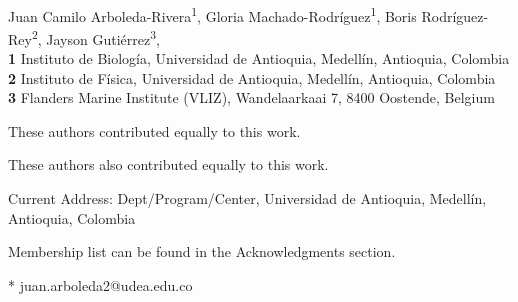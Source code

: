 \documentclass[10pt,letterpaper]{article}
\date{}
\begin{document}
\vspace*{0.2in}

\begin{flushleft}
{\Large
\textbf{} %
}
\newline
\\
Juan Camilo Arboleda-Rivera\textsuperscript{1\Yinyang},
Gloria Machado-Rodríguez\textsuperscript{1\Yinyang},
Boris Rodríguez-Rey\textsuperscript{2\textcurrency},
Jayson Gutiérrez\textsuperscript{3},
\\
\bigskip
\textbf{1} Instituto de Biología, Universidad de Antioquia, Medellín,
Antioquia, Colombia
\\
\textbf{2} Instituto de Física, Universidad de Antioquia, Medellín, Antioquia,
Colombia
\\
\textbf{3} Flanders Marine Institute (VLIZ), Wandelaarkaai 7, 8400 Oostende,
Belgium
\\
\bigskip

% 
%
\Yinyang These authors contributed equally to this work.

\ddag These authors also contributed equally to this work.

\textcurrency Current Address: Dept/Program/Center, Universidad de Antioquia, 
Medellín, Antioquia, Colombia %


\textpilcrow Membership list can be found in the Acknowledgments section.

* juan.arboleda2@udea.edu.co

\end{flushleft}
\end{document}
